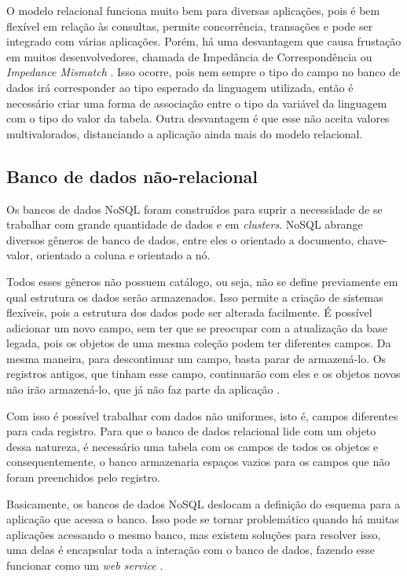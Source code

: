 O modelo relacional funciona muito bem para diversas aplicações, pois é bem flexível em relação às consultas, permite concorrência, transações e pode ser integrado com várias aplicações. Porém, há uma desvantagem que causa frustação em muitos desenvolvedores, chamada de Impedância de Correspondência ou \textit{Impedance Mismatch} \cite{Elmasri,NoSQL}. Isso ocorre, pois nem sempre o tipo do campo no banco de dados irá corresponder ao tipo esperado da linguagem utilizada, então é necessário criar uma forma de associação entre o tipo da variável da linguagem com o tipo do valor da tabela. Outra desvantagem é que esse não aceita valores multivalorados, distanciando a aplicação ainda mais do modelo relacional.


\subsection{Banco de dados não-relacional}
\label{subsec:nosqldatabasetype}
Os bancos de dados NoSQL foram construídos para suprir a necessidade de se trabalhar com grande quantidade de dados e em \textit{clusters}. NoSQL abrange diversos gêneros de banco de dados, entre eles o orientado a documento, chave-valor, orientado a coluna e orientado a nó.

Todos esses gêneros não possuem catálogo, ou seja, não se define previamente em qual estrutura os dados serão armazenados. Isso permite a criação de sistemas flexíveis, pois a estrutura dos dados pode ser alterada facilmente. É possível adicionar um novo campo, sem ter que se preocupar com a atualização da base legada, pois os objetos de uma mesma coleção podem ter diferentes campos. Da mesma maneira, para descontinuar um campo, basta parar de armazená-lo. Os registros antigos, que tinham esse campo, continuarão com eles e os objetos novos não irão armazená-lo, que já não faz parte da aplicação \cite{NoSQL}.

Com isso é possível trabalhar com dados não uniformes, isto é, campos diferentes para cada registro. Para que o banco de dados relacional lide com um objeto dessa natureza, é necessário uma tabela com os campos de todos os objetos e consequentemente, o banco armazenaria espaços vazios para os campos que não foram preenchidos pelo registro.

Basicamente, os bancos de dados NoSQL deslocam a definição do esquema para a aplicação que acessa o banco. Isso pode se tornar problemático quando há muitas aplicações acessando o mesmo banco, mas existem soluções para resolver isso, uma delas é encapsular toda a interação com o banco de dados, fazendo esse funcionar como um \textit{web service} \cite{NoSQL}.

